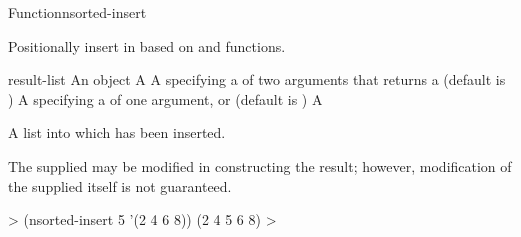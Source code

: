 \documentclass[10pt,twoside,english,pdftex]{article}
\begin{document}
\begin{functiondoc}{Function}{nsorted-insert}{
    }
%
%
  
\fnsyntax

\fnpurpose Positionally insert  in  based on
 and  functions.

\fnpackage {}

\fnmodule {}

\fnargs
\begin{args}{result-list}
\arg[item] An object
\arg[list] A 
\arg[predicate] A  specifying a
 of two arguments that returns a
 (default is )
\arg[key] A  specifying a 
of one argument, or \nil{} (default is \nil)
 A 
\end{args}

\fnreturns A list into which  has been inserted.

\fndescription The supplied  may be modified in
constructing the result; however, modification of the supplied
 itself is not guaranteed.

\fnexample
%
\W\supp
\begin{example}
  > (nsorted-insert 5 '(2 4 6 8))
  (2 4 5 6 8)
  >
\end{example}

\end{functiondoc}

\end{document}
